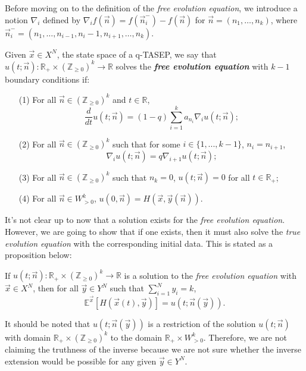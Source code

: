 Before moving on to the definition of the \emph{free evolution equation}, we introduce a notion $\nabla_i$ defined by $\nabla_i f(\vec{n}) = f(\vec{n}_i^-) - f(\vec{n})$ for $\vec{n} = (n_1, \dots, n_k)$, where $\vec{n}_i^- = (n_1,\dots,n_{i-1}, n_i - 1, n_{i+1}, \dots, n_k)$.

\begin{definition}
\label{def:free-evolution-equation}
Given $\vec{x} \in X^N$, the state space of a q-TASEP, we say that $u(t;\vec{n}):\mathbb{R}_+ \times (\mathbb{Z}_{\ge 0})^k \rightarrow \mathbb{R}$ solves the \textbf{\emph{free evolution equation}} with $k-1$ boundary conditions if:
\begin{enumerate}
\item[(1)] For all $\vec{n} \in (\mathbb{Z}_{\ge 0})^k$ and $t \in \mathbb{R}$, $$\frac{d}{dt} u(t;\vec{n}) = (1-q) \sum_{i=1}^{k} a_{n_i} \nabla_i u(t;\vec{n});$$
\item[(2)] For all $\vec{n} \in (\mathbb{Z}_{\ge 0})^k$ such that for some $i \in \{1,...,k-1\}$, $n_i = n_{i+1}$, $$\nabla_i u(t;\vec{n}) = q \nabla_{i+1} u(t;\vec{n});$$
\item[(3)] For all $\vec{n} \in (\mathbb{Z}_{\ge 0})^k$ such that $n_k = 0$, $u(t;\vec{n}) = 0$ for all $t \in \mathbb{R}_+$;
\item[(4)] For all $\vec{n} \in W^k_{>0}$, $u(0,\vec{n}) = H(\vec{x},\vec{y}(\vec{n}))$. 
\end{enumerate}
\end{definition}

It's not clear up to now that a solution exists for the \emph{free evolution equation}. However, we are going to show that if one exists, then it must also solve the \emph{true evolution equation} with the corresponding initial data. This is stated as a proposition below:

\begin{proposition}
If $u(t;\vec{n}):\mathbb{R}_+ \times (\mathbb{Z}_{\ge 0})^k \rightarrow \mathbb{R}$ is a solution to the \emph{free evolution equation} with $\vec{x} \in X^N$, then for all $\vec{y} \in Y^N$ such that $\sum_{i=1}^{N} y_i = k$, $$\mathbb{E}^{\vec{x}}[H(\vec{x}(t), \vec{y})] = u(t;\vec{n}(\vec{y})).$$
\end{proposition}

\begin{remark}
It should be noted that $u(t;\vec{n}(\vec{y}))$ is a restriction of the solution $u(t;\vec{n})$ with domain $\mathbb{R}_+ \times (\mathbb{Z}_{\ge 0})^k$ to the domain $\mathbb{R}_+ \times W_{>0}^k$. Therefore, we are not claiming the truthness of the inverse because we are not sure whether the inverse extension would be possible for any given $\vec{y} \in Y^N$.
\end{remark}

